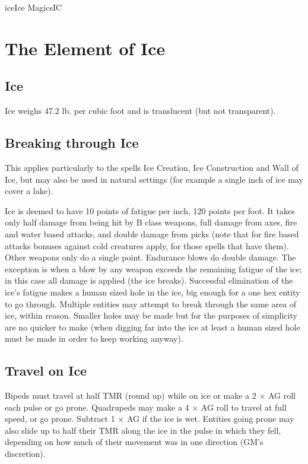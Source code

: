 \begin{College}[1.5]{ice}{Ice Magics}{IC}
\section{The Element of Ice}

\subsection{Ice}

Ice weighs 47.2 lb. per cubic foot and is translucent 
(but not transparent). 

\subsection{Breaking through Ice}

This applies particularly to the spells Ice Creation, Ice Construction
and Wall of Ice, but may also be used in natural settings (for example
a single inch of ice may cover a lake).

Ice is deemed to have 10 points of fatigue per inch, 120 points per
foot. It takes only half damage from being hit by B class weapons,
full damage from axes, fire and water based attacks, and double damage
from picks (note that for fire based attacks bonuses against cold
creatures apply, for those spells that have them).  Other weapons only
do a single point.  Endurance blows do double damage.  The exception
is when a blow by any weapon exceeds the remaining fatigue of the ice;
in this case all damage is applied (the ice breaks).  Successful
elimination of the ice’s fatigue makes a human sized hole in the ice,
big enough for a one hex entity to go through.  Multiple entities may
attempt to break through the same area of ice, within reason.  Smaller
holes may be made but for the purposes of simplicity are no quicker to
make (when digging far into the ice at least a human sized hole must
be made in order to keep working anyway).

\subsection{Travel on Ice}

Bipeds must travel at half TMR (round up) while on ice or make a 2 ×
AG roll each pulse or go prone.  Quadrupeds may make a 4 × AG roll to
travel at full speed, or go prone.  Subtract 1 × AG if the ice is wet.
Entities going prone may also slide up to half their TMR along the ice
in the pulse in which they fell, depending on how much of their
movement was in one direction (GM’s discretion).


\end{College}
